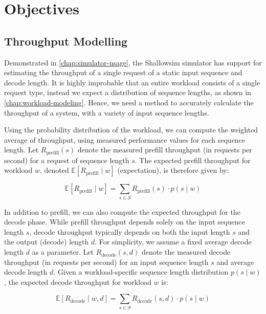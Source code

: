 \section{Objectives}

%


\subsection{Throughput Modelling}
\label{chap:throughput-modelling}

Demonstrated in \autoref{chap:simulator-usage}, the Shallowsim simulator has support for estimating the throughput of a single request of a static input sequence and decode length.
It is highly improbable that an entire workload consists of a single request type, instead we expect a distribution of sequence lengths, as shown in \autoref{chap:workload-modeling}.
Hence, we need a method to accurately calculate the throughput of a system, with a variety of input sequence lengths.

Using the probability distribution of the workload, we can compute the weighted average of throughput, using measured performance values for each sequence length.
Let $R_{\text{prefill}}(s)$ denote the measured prefill throughput (in requests per second) for a request of sequence length $s$.
The expected prefill throughput for workload $w$, denoted $\mathbb{E}[R_{\text{prefill}} \mid w]$ (expectation), is therefore given by:

\[
\mathbb{E}[R_{\text{prefill}} \mid w] = \sum_{s \in S} R_{\text{prefill}}(s) \cdot p(s \mid w)
\]

In addition to prefill, we can also compute the expected throughput for the decode phase. 
While prefill throughput depends solely on the input sequence length $s$, decode throughput typically depends on both the input length $s$ and the output (decode) length $d$.
For simplicity, we assume a fixed average decode length $d$ as a parameter.
Let $R_{\text{decode}}(s, d)$ denote the measured decode throughput (in requests per second) for an input sequence length $s$ and average decode length $d$.
Given a workload-specific sequence length distribution $p(s \mid w)$, the expected decode throughput for workload $w$ is:

\[
\mathbb{E}[R_{\text{decode}} \mid w, d] = \sum_{s \in S} R_{\text{decode}}(s, d) \cdot p(s \mid w)
\]

